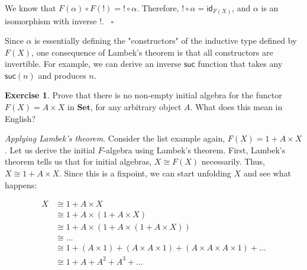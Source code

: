 \documentclass{article}
\theoremstyle{plain}
\theoremstyle{definition}
\newtheorem{exercise}{Exercise}
\begin{document}
\begin{center}
\end{center}


We know that \ensuremath{F\left( \alpha \right) \circ F\left( ! \right) = ! \circ \alpha}. Therefore, \ensuremath{! \circ \alpha = {\mathsf{id}}_{F\left( X \right)}}, and \ensuremath{\alpha} is an isomorphism with inverse \ensuremath{!}.  ~\ensuremath{\square}

Since \ensuremath{\alpha} is essentially defining the "constructors" of the inductive type defined by \ensuremath{F\left( X \right)}, one consequence of Lambek's theorem is that all constructors are invertible. For example, we can derive an inverse \ensuremath{\mathsf{suc}} function that takes any \ensuremath{\mathsf{suc}\left( n \right)} and produces \ensuremath{n}.

\begin{exercise}
Prove that there is no non-empty initial algebra for the functor \ensuremath{F\left( X \right) = A \times X} in \ensuremath{\mathbf{Set}}, for any arbitrary object \ensuremath{A}. What does this mean in English?
\end{exercise}
\label{noAXinitial} 

\emph{Applying Lambek's theorem}.  Consider the list example again, \ensuremath{F\left( X \right) = 1 + A \times X}. Let us derive the initial \ensuremath{F}-algebra using Lambek's theorem. First, Lambek's theorem tells us that for initial algebras, \ensuremath{X \cong F\left( X \right)} necessarily. Thus, \ensuremath{X \cong 1 + A \times X}. Since this is a fixpoint, we can start unfolding \ensuremath{X} and see what happens:

\[
\begin{aligned}
X & \cong 1 + A \times X \\ & \cong 1 + A \times \left( 1 + A \times X \right) \\ & \cong 1 + A \times \left( 1 + A \times \left( 1 + A \times X \right) \right) \\ & \cong \ldots \\ & \cong 1 + \left( A \times 1 \right) + \left( A \times A \times 1 \right) + \left( A \times A \times A \times 1 \right) + \ldots \\ & \cong 1 + A + {A}^{2} + {A}^{3} + \ldots
\end{aligned}
\]
\end{document}

